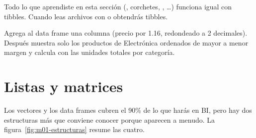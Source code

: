 Todo lo que aprendiste en esta sección (\codigo{\$}, corchetes,
, \ldots) funciona igual con tibbles.
Cuando leas archivos con  o  obtendrás
tibbles.

\begin{hazlotu}
Agrega al data frame  una columna
 (precio por 1.16, redondeado a 2 decimales).
Después muestra solo los productos de Electrónica ordenados de mayor a
menor margen y calcula con  las unidades totales por
categoría.
\end{hazlotu}

\section{Listas y matrices}
\label{sec:m1-listas-matrices}

Los vectores y los data frames cubren el 90\% de lo que harás en BI, pero
hay dos estructuras más que conviene conocer porque aparecen a menudo. La
figura~\ref{fig:m01-estructuras} resume las cuatro.

